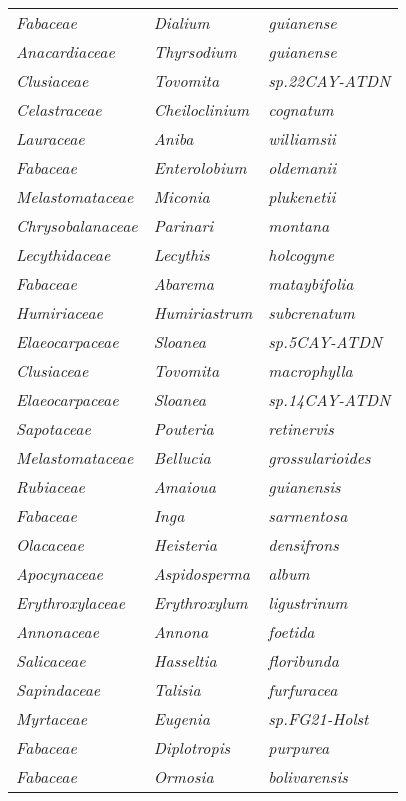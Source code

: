 \documentclass[fleqn,10pt]{ArtEcoFoG} %
\renewenvironment{table}{\begin{table*}}{\end{table*}\ignorespacesafterend}
\begin{document}
\begin{table}
\begin{tabular}[t]{lll}
\em{Fabaceae} & \em{Dialium} & \em{guianense}\\
\addlinespace
\em{Anacardiaceae} & \em{Thyrsodium} & \em{guianense}\\
\em{Clusiaceae} & \em{Tovomita} & \em{sp.22CAY-ATDN}\\
\em{Celastraceae} & \em{Cheiloclinium} & \em{cognatum}\\
\em{Lauraceae} & \em{Aniba} & \em{williamsii}\\
\em{Fabaceae} & \em{Enterolobium} & \em{oldemanii}\\
\addlinespace
\em{Melastomataceae} & \em{Miconia} & \em{plukenetii}\\
\em{Chrysobalanaceae} & \em{Parinari} & \em{montana}\\
\em{Lecythidaceae} & \em{Lecythis} & \em{holcogyne}\\
\em{Fabaceae} & \em{Abarema} & \em{mataybifolia}\\
\em{Humiriaceae} & \em{Humiriastrum} & \em{subcrenatum}\\
\addlinespace
\em{Elaeocarpaceae} & \em{Sloanea} & \em{sp.5CAY-ATDN}\\
\em{Clusiaceae} & \em{Tovomita} & \em{macrophylla}\\
\em{Elaeocarpaceae} & \em{Sloanea} & \em{sp.14CAY-ATDN}\\
\em{Sapotaceae} & \em{Pouteria} & \em{retinervis}\\
\em{Melastomataceae} & \em{Bellucia} & \em{grossularioides}\\
\addlinespace
\em{Rubiaceae} & \em{Amaioua} & \em{guianensis}\\
\em{Fabaceae} & \em{Inga} & \em{sarmentosa}\\
\em{Olacaceae} & \em{Heisteria} & \em{densifrons}\\
\em{Apocynaceae} & \em{Aspidosperma} & \em{album}\\
\em{Erythroxylaceae} & \em{Erythroxylum} & \em{ligustrinum}\\
\addlinespace
\em{Annonaceae} & \em{Annona} & \em{foetida}\\
\em{Salicaceae} & \em{Hasseltia} & \em{floribunda}\\
\em{Sapindaceae} & \em{Talisia} & \em{furfuracea}\\
\em{Myrtaceae} & \em{Eugenia} & \em{sp.FG21-Holst}\\
\em{Fabaceae} & \em{Diplotropis} & \em{purpurea}\\
\addlinespace
\em{Fabaceae} & \em{Ormosia} & \em{bolivarensis}\\

\end{tabular}
\end{table}
\end{document}
